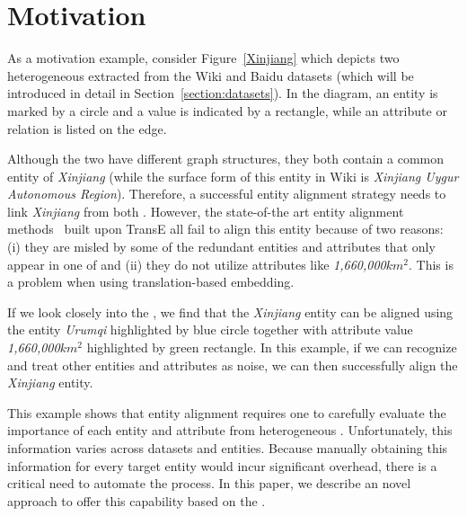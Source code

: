 \section{Motivation}
As a motivation example, consider Figure~\ref{Xinjiang} which depicts two heterogeneous \KGs extracted from the Wiki and Baidu datasets (which will be introduced in detail in Section~\ref{section:datasets}). In the diagram, an entity is marked by a circle and a value is indicated by a rectangle, while an attribute or relation is listed on the edge.

Although the two \KGs have different graph structures, they both contain a common entity of \emph{Xinjiang} (while the surface form of this entity in Wiki is \emph{Xinjiang Uygur Autonomous Region}). Therefore, a successful entity alignment strategy needs to link \emph{Xinjiang} from both \KGs. However, the state-of-the art entity alignment methods~\cite{hao2016joint,chen2016multilingual,sun2017cross,zhu2017iterative} built upon
TransE all fail to align this entity because of two reasons: (i) they are misled by some of the redundant entities and attributes that only
appear in one of \KGs and (ii) they do not utilize attributes like \emph{1,660,000$km^2$}. This is a problem when using translation-based embedding.

If we look closely into the \KGs, we find that the \emph{Xinjiang} entity can be aligned using the entity \emph{Urumqi} highlighted by blue circle together with attribute value \emph{1,660,000$km^2$} highlighted by green rectangle. In this example, if we can recognize and treat other entities and attributes as noise, we can
then successfully align the \emph{Xinjiang} entity.

This example shows that entity alignment requires one to carefully evaluate the importance of each entity and attribute from heterogeneous
\KGs. Unfortunately, this information varies across datasets and entities. Because manually obtaining this information for every target
entity would incur significant overhead, there is a critical need to automate the process. In this paper, we describe an novel approach to
offer this capability based on the \RGCN.
